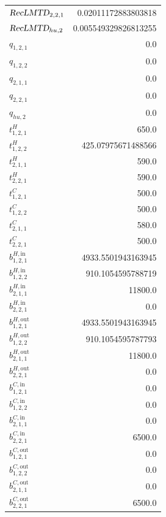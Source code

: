 \documentclass{article}%
\begin{document}
\begin{multicols*}{3}
\begin{supertabular}{lr}
	$\textsl{RecLMTD}_{2,2,1}$ & 0.02011172883803818 \\%
	$\textsl{RecLMTD}_{hu,2}$ & 0.005549329826813255 \\%
	$q_{1,2,1}$ & 0.0 \\%
	$q_{1,2,2}$ & 0.0 \\%
	$q_{2,1,1}$ & 0.0 \\%
	$q_{2,2,1}$ & 0.0 \\%
	$q_{hu,2}$ & 0.0 \\%
	$t_{1,2,1}^{H}$ & 650.0 \\%
	$t_{1,2,2}^{H}$ & 425.07975671488566 \\%
	$t_{2,1,1}^{H}$ & 590.0 \\%
	$t_{2,2,1}^{H}$ & 590.0 \\%
	$t_{1,2,1}^{C}$ & 500.0 \\%
	$t_{1,2,2}^{C}$ & 500.0 \\%
	$t_{2,1,1}^{C}$ & 580.0 \\%
	$t_{2,2,1}^{C}$ & 500.0 \\%
	$b_{1,2,1}^{H,\text{in}}$ & 4933.5501943163945 \\%
	$b_{1,2,2}^{H,\text{in}}$ & 910.1054595788719 \\%
	$b_{2,1,1}^{H,\text{in}}$ & 11800.0 \\%
	$b_{2,2,1}^{H,\text{in}}$ & 0.0 \\%
	$b_{1,2,1}^{H,\text{out}}$ & 4933.5501943163945 \\%
	$b_{1,2,2}^{H,\text{out}}$ & 910.1054595787793 \\%
	$b_{2,1,1}^{H,\text{out}}$ & 11800.0 \\%
	$b_{2,2,1}^{H,\text{out}}$ & 0.0 \\%
	$b_{1,2,1}^{C,\text{in}}$ & 0.0 \\%
	$b_{1,2,2}^{C,\text{in}}$ & 0.0 \\%
	$b_{2,1,1}^{C,\text{in}}$ & 0.0 \\%
	$b_{2,2,1}^{C,\text{in}}$ & 6500.0 \\%
	$b_{1,2,1}^{C,\text{out}}$ & 0.0 \\%
	$b_{1,2,2}^{C,\text{out}}$ & 0.0 \\%
	$b_{2,1,1}^{C,\text{out}}$ & 0.0 \\%
	$b_{2,2,1}^{C,\text{out}}$ & 6500.0 \\%
\end{supertabular}%
\end{multicols*}%
\end{document}
